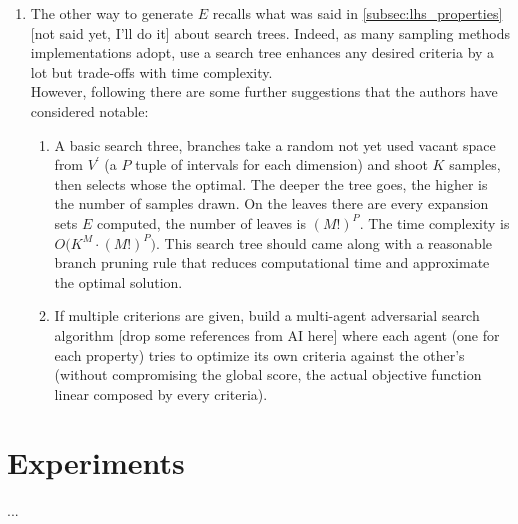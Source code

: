 \documentclass[12pt]{extarticle}
\begin{document}
\begin{enumerate}
\begin{enumerate}
	\item The other way to generate $E$ recalls what was said in \cref{subsec:lhs_properties} [not said yet, I'll do it] about search trees. Indeed, as many sampling methods implementations adopt, use a search tree enhances any desired criteria by a lot but trade-offs with time complexity. \\
	However, following there are some further suggestions that the authors have considered notable:
	\begin{enumerate}
		\item A basic search three, branches take a random not yet used vacant space from $V^\prime$ (a $P$ tuple of intervals for each dimension) and shoot $K$ samples, then selects whose the optimal. The deeper the tree goes, the higher is the number of samples drawn. On the leaves there are every expansion sets $E$ computed, the number of leaves is $(M!)^P$. The time complexity is $O\big( K^M \cdot (M!)^P\big)$. This search tree should came along with a reasonable branch pruning rule that reduces computational time and approximate the optimal solution.
		
		\item If multiple criterions are given, build a multi-agent adversarial search algorithm [drop some references from AI here] where each agent (one for each property) tries to optimize its own criteria against the other's (without compromising the global score, the actual objective function linear composed by every criteria).
	
	\end{enumerate}


\end{enumerate}
\end{enumerate}


%		
		



\section{Experiments}
\label{sec:experiments}
...
\end{document}
